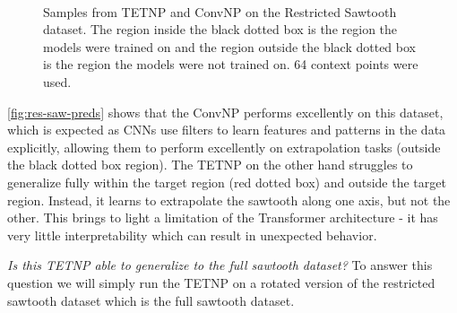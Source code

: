 \documentclass[../../main.tex]{subfiles}
\begin{document}
\begin{figure}[H]
    \centering
    \\
    \caption{Samples from TETNP and ConvNP on the Restricted Sawtooth dataset. The region inside the black dotted box is the region the models were trained on and the region outside the black dotted box is the region the models were not trained on. 64 context points were used.}
    \label{fig:res-saw-preds}
\end{figure}

\autoref{fig:res-saw-preds} shows that the ConvNP performs excellently on this dataset, which is expected as CNNs use filters to learn features and patterns in the data explicitly, allowing them to perform excellently on extrapolation tasks (outside the black dotted box region). The TETNP on the other hand struggles to generalize fully within the target region (red dotted box) and outside the target region. Instead, it learns to extrapolate the sawtooth along one axis, but not the other. This brings to light a limitation of the Transformer architecture - it has very little interpretability which can result in unexpected behavior.

\emph{Is this TETNP able to generalize to the full sawtooth dataset?} To answer this question we will simply run the TETNP on a rotated version of the restricted sawtooth dataset which is the full sawtooth dataset.



\end{document}
